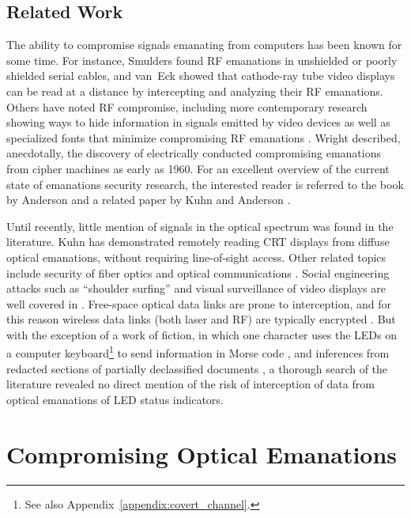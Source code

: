 \documentclass{acmtrans2e}
\begin{document}
\subsection{Related Work}

The ability to compromise signals emanating from computers has been known
for some time.  For instance, Smulders \citeyear{smulders} found
RF emanations in unshielded or poorly shielded serial cables, and
van~Eck \citeyear{van_Eck} showed that cathode-ray tube video
displays can be read at a distance by intercepting and analyzing
their RF emanations.  Others have noted RF compromise, including
more contemporary research showing ways to hide
information in signals emitted by video devices as well as specialized
fonts that minimize compromising RF emanations \cite{kuhn_and_anderson}.
Wright \citeyear{wright} described, anecdotally, the discovery of
electrically conducted compromising emanations from cipher machines as
early as 1960.  For an excellent overview of the current state
of emanations security research, the interested reader is referred to 
the book by Anderson \citeyear{anderson_security_engineering} and a
related paper by Kuhn and Anderson \citeyear{kuhn_and_anderson}.

Until recently, little mention of signals in the optical spectrum was
found in the literature.  Kuhn \citeyear{markus} has demonstrated
remotely reading CRT displays from diffuse optical emanations, without
requiring line-of-sight access. Other related topics include security
of fiber optics
\cite{hodara_1991,exfo_data_sheet} and optical communications
\cite{wilkins_1641}.  Social engineering attacks such as ``shoulder
surfing'' and visual surveillance of video displays are well covered
in \cite{fites_and_kratz}.  Free-space optical data links are prone
to interception, and  for this reason wireless data links (both laser
and RF) are typically encrypted \cite{lathrop}.  But with the exception
of a work of fiction, in which one character uses the LEDs on a computer
keyboard\footnote{See also Appendix~\ref{appendix:covert_channel}.}
to send information in Morse code \cite{cryptonomicon}, and inferences
from redacted sections of partially declassified
documents \cite{NACSIM_5000}, a thorough search of the literature
revealed no direct mention of the risk of interception of data from
optical emanations of LED status indicators.

\section{Compromising Optical Emanations}
\end{document}
